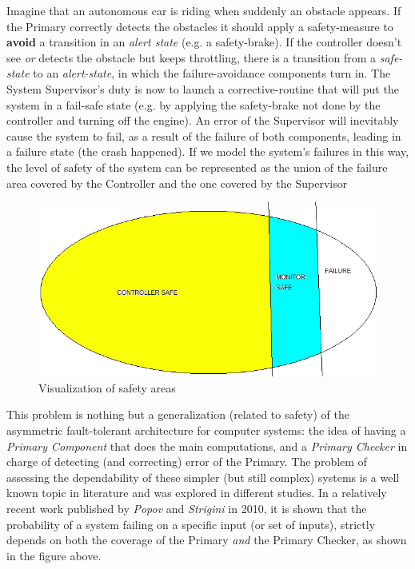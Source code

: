Imagine that an autonomous car is riding when suddenly an obstacle appears. If the Primary correctly detects the obstacles it should apply a safety-measure to \textbf{avoid} a transition in an \textsl{alert state} (e.g. a safety-brake). If the controller doesn't see \textsl{or} detects the obstacle but keeps throttling, there is a transition from a \textsl{safe-state} to an \textsl{alert-state}, in which the failure-avoidance components turn in. The System Supervisor's duty is now to launch a corrective-routine that will put the system in a fail-safe state (e.g. by applying the safety-brake not done by the controller and turning off the engine). An error of the Supervisor will inevitably cause the system to fail, as a result of the failure of both components, leading in a failure state (the crash happened). If we model the system's failures in this way, the level of safety of the system can be represented as the union of the failure area covered by the Controller and the one covered by the Supervisor

\begin{figure}[h!]
	\includegraphics[width=\textwidth]{img/safety-area.png}
	\caption{Visualization of safety areas}
\end{figure}

This problem is nothing but a generalization (related to safety) of the asymmetric fault-tolerant architecture for computer systems: the idea of having a \textsl{Primary Component} that does the main computations, and a \textsl{Primary Checker} in charge of detecting (and correcting) error of the Primary.\newline
The problem of assessing the dependability of these simpler (but still complex) systems is a well known topic in literature and was explored in different studies. In a relatively recent work published by \textsl{Popov} and \textsl{Strigini} in 2010, it is shown that the probability of a system failing on a specific input (or set of inputs), strictly depends on both the coverage of the Primary \textsl{and} the Primary Checker, as shown in the figure above.\cite{striginiPopov}

